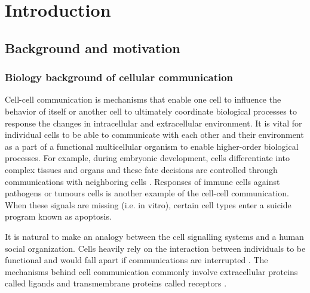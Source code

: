 \chapter[Introduction]{Introduction}
\label{Chap:Intro}


\section{Background and motivation}
\subsection{Biology background of cellular communication}
Cell-cell communication is mechanisms that enable one cell to influence the behavior of itself or another cell to ultimately coordinate biological processes to response the changes in intracellular and extracellular environment. It is vital for individual cells to be able to communicate with each other and their environment as a part of a functional multicellular organism to enable higher-order biological processes. For example, during embryonic development, cells differentiate into complex tissues and organs and these fate decisions are controlled through communications with neighboring cells \cite{gale1996eph, eichmann1997ligand}. Responses of immune cells against pathogens or tumours cells is another example of the cell-cell communication. When these signals are missing (i.e. in vitro), certain cell types enter a suicide program known as apoptosis. 

It is natural to make an analogy between the cell signalling systems and a human social organization. Cells heavily rely on the interaction between individuals to be functional and would fall apart if communications are interrupted \cite{bartee2018principles}. The mechanisms behind cell communication commonly involve extracellular proteins called ligands and transmembrane proteins called receptors \cite{alberts2018molecular}. 

